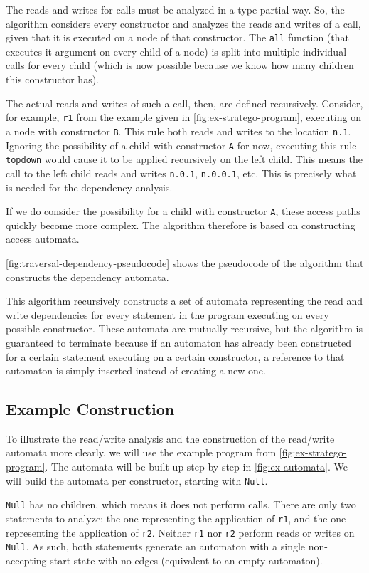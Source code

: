 The reads and writes for calls must be analyzed in a type-partial way. So, the algorithm considers every constructor and analyzes the reads and writes of a call, given that it is executed on a node of that constructor. The \texttt{all} function (that executes it argument on every child of a node) is split into multiple individual calls for every child (which is now possible because we know how many children this constructor has).

The actual reads and writes of such a call, then, are defined recursively. Consider, for example, \texttt{r1} from the example given in \autoref{fig:ex-stratego-program}, executing on a node with constructor \texttt{B}. This rule both reads and writes to the location \texttt{n.1}. Ignoring the possibility of a child with constructor \texttt{A} for now, executing this rule \texttt{topdown} would cause it to be applied recursively on the left child. This means the call to the left child reads and writes \texttt{n.0.1}, \texttt{n.0.0.1}, etc. This is precisely what is needed for the dependency analysis.

If we do consider the possibility for a child with constructor \texttt{A}, these access paths quickly become more complex. The algorithm therefore is based on constructing access automata. 

\autoref{fig:traversal-dependency-pseudocode} shows the pseudocode of the algorithm that constructs the dependency automata.

This algorithm recursively constructs a set of automata representing the read and write dependencies for every statement in the program executing on every possible constructor. These automata are mutually recursive, but the algorithm is guaranteed to terminate because if an automaton has already been constructed for a certain statement executing on a certain constructor, a reference to that automaton is simply inserted instead of creating a new one.

\subsection{Example Construction}
To illustrate the read/write analysis and the construction of the read/write automata more clearly, we will use the example program from \autoref{fig:ex-stratego-program}. The automata will be built up step by step in \autoref{fig:ex-automata}. We will build the automata per constructor, starting with \texttt{Null}.

\texttt{Null} has no children, which means it does not perform calls. There are only two statements to analyze: the one representing the application of \texttt{r1}, and the one representing the application of \texttt{r2}. Neither \texttt{r1} nor \texttt{r2} perform reads or writes on \texttt{Null}. As such, both statements generate an automaton with a single non-accepting start state with no edges (equivalent to an empty automaton).

